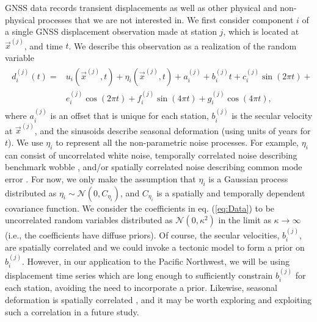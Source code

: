 \documentclass[extra,mreferee]{gji}
\begin{document}
GNSS data records transient displacements as well as other physical and non-physical processes that we are not interested in. We first consider component $i$ of a single GNSS displacement observation made at station $j$, which is located at $\vec{x}^{(j)}$, and time $t$. We describe this observation as a realization of the random variable 
\begin{align}\label{eq:Data}
\begin{split}
d^{(j)}_i(t) = &u_i(\vec{x}^{(j)},t) + \eta_i(\vec{x}^{(j)},t) + a_i^{(j)} + b_i^{(j)}t + c_i^{(j)}\sin(2 \pi t) + \\ 
               &e_i^{(j)}\cos(2 \pi t) + f_i^{(j)}\sin(4 \pi t)  + g_i^{(j)}\cos(4 \pi t), 
\end{split}
\end{align}
where $a_i^{(j)}$ is an offset that is unique for each station, $b_i^{(j)}$ is the secular velocity at $\vec{x}^{(j)}$, and the sinusoids describe seasonal deformation (using units of years for $t$). We use $\eta_i$ to represent all the non-parametric noise processes. For example, $\eta_i$ can consist of uncorrelated white noise, temporally correlated noise describing benchmark wobble \citep[e.g.,][]{Wyatt1982,Wyatt1989}, and/or spatially correlated noise describing common mode error \citep[e.g.,][]{Wdowinski1997}. For now, we only make the assumption that $\eta_i$ is a Gaussian process distributed as $\eta_i \sim \mathcal{N}(0,C_{\eta_i})$, and $C_{\eta_i}$ is a spatially and temporally dependent covariance function. We consider the coefficients in eq. (\ref{eq:Data}) to be uncorrelated random variables distributed as $\mathcal{N}(0,\kappa^2)$ in the limit as $\kappa \to \infty$ (i.e., the coefficients have diffuse priors). Of course, the secular velocities, $b_i^{(j)}$, are spatially correlated and we could invoke a tectonic model to form a prior on $b_i^{(j)}$. However, in our application to the Pacific Northwest, we will be using displacement time series which are long enough to sufficiently constrain $b_i^{(j)}$ for each station, avoiding the need to incorporate a prior. Likewise, seasonal deformation is spatially correlated \citep{Dong2002,Langbein2008}, and it may be worth exploring and exploiting such a correlation in a future study. 
\end{document}

